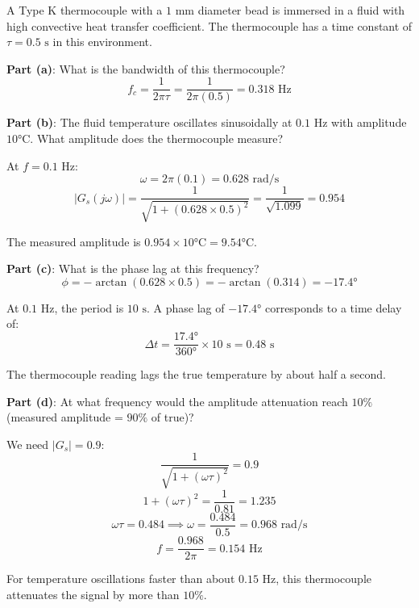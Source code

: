 \begin{example}
\label{ex:thermocouple_dynamics}

A Type K thermocouple with a $1\text{ mm}$ diameter bead is immersed in a fluid with high convective heat transfer coefficient. The thermocouple has a time constant of $\tau = 0.5\text{ s}$ in this environment.

\textbf{Part (a)}: What is the bandwidth of this thermocouple?
\begin{equation}
f_c = \frac{1}{2\pi\tau} = \frac{1}{2\pi(0.5)} = 0.318\text{ Hz}
\end{equation}

\textbf{Part (b)}: The fluid temperature oscillates sinusoidally at $0.1\text{ Hz}$ with amplitude $10°\text{C}$. What amplitude does the thermocouple measure?

At $f = 0.1\text{ Hz}$:
\begin{equation}
\omega = 2\pi(0.1) = 0.628\text{ rad/s}
\end{equation}
\begin{equation}
|G_s(j\omega)| = \frac{1}{\sqrt{1 + (0.628 \times 0.5)^2}} = \frac{1}{\sqrt{1.099}} = 0.954
\end{equation}

The measured amplitude is $0.954 \times 10°\text{C} = 9.54°\text{C}$.

\textbf{Part (c)}: What is the phase lag at this frequency?
\begin{equation}
\phi = -\arctan(0.628 \times 0.5) = -\arctan(0.314) = -17.4°
\end{equation}

At $0.1\text{ Hz}$, the period is $10\text{ s}$. A phase lag of $-17.4°$ corresponds to a time delay of:
\begin{equation}
\Delta t = \frac{17.4°}{360°} \times 10\text{ s} = 0.48\text{ s}
\end{equation}

The thermocouple reading lags the true temperature by about half a second.

\textbf{Part (d)}: At what frequency would the amplitude attenuation reach $10\%$ (measured amplitude = $90\%$ of true)?

We need $|G_s| = 0.9$:
\begin{equation}
\frac{1}{\sqrt{1 + (\omega\tau)^2}} = 0.9
\end{equation}
\begin{equation}
1 + (\omega\tau)^2 = \frac{1}{0.81} = 1.235
\end{equation}
\begin{equation}
\omega\tau = 0.484 \implies \omega = \frac{0.484}{0.5} = 0.968\text{ rad/s}
\end{equation}
\begin{equation}
f = \frac{0.968}{2\pi} = 0.154\text{ Hz}
\end{equation}

For temperature oscillations faster than about $0.15\text{ Hz}$, this thermocouple attenuates the signal by more than $10\%$.
\end{example}


